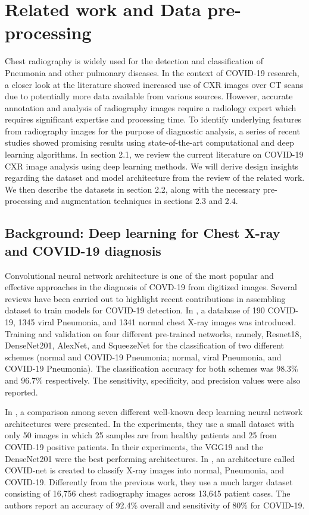 \section{Related work and Data pre-processing}
\label{sec:background}
Chest radiography is widely used for the detection and classification of Pneumonia and other pulmonary diseases. In the context of COVID-19 research, a closer look at the literature showed increased use of CXR images over CT scans due to potentially more data available from various sources.  However, accurate annotation and analysis of radiography images require a radiology expert which requires significant expertise and processing time.  
To identify underlying features from radiography images for the purpose of diagnostic analysis, a series of recent studies showed promising results using state-of-the-art computational and deep learning algorithms. In section 2.1, we review the current literature on COVID-19 CXR image analysis using deep learning methods. We will derive design insights regarding the dataset and model architecture from the review of the related work. We then describe the datasets in section 2.2,  along with the necessary pre-processing and augmentation techniques in sections 2.3 and 2.4.

\subsection{ Background: Deep learning for Chest X-ray and COVID-19 diagnosis}


Convolutional neural network architecture  is one of the most popular and effective
approaches in the diagnosis of COVD-19 from digitized images. Several reviews have been carried out to highlight recent contributions in assembling dataset to train models for COVID-19 detection. In \cite{chowdhury2020can}, a database  of 190 COVID-19, 1345 viral Pneumonia, and 1341 normal chest X-ray images was introduced. Training and validation on four different pre-trained networks, namely, Resnet18, DenseNet201, AlexNet, and SqueezeNet for the classification of two different schemes (normal and COVID-19 Pneumonia; normal, viral Pneumonia, and COVID-19 Pneumonia). The classification accuracy for both schemes was 98.3\% and 96.7\% respectively. The sensitivity, specificity, and precision values were also reported.

In \cite{hemdan2020covidx}, a comparison among seven different well-known deep learning neural network architectures were presented. In the experiments, they use a small dataset with only 50 images in which 25 samples are from healthy patients and 25 from COVID-19 positive patients. In their experiments, the VGG19 and the DenseNet201 were the best performing architectures. In \cite{wang2020covid}, an architecture called COVID-net is created to classify X-ray images into normal, Pneumonia, and COVID-19. Differently from the previous work, they use a much larger dataset consisting of 16,756 chest radiography images across 13,645 patient cases. The authors report an accuracy of 92.4\% overall and sensitivity of 80\% for COVID-19.
 
